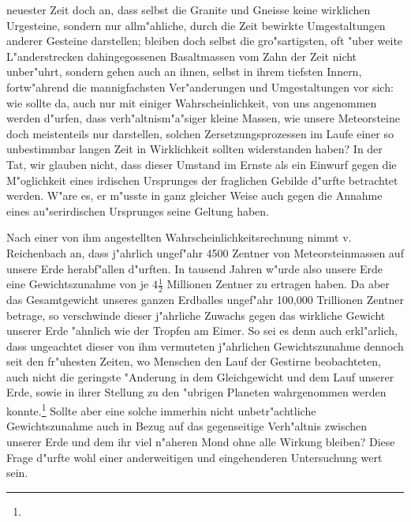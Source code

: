 \documentclass[a4paper, 8pt, oneside, polutonikogreek, german]{article}
\begin{document}
neuester Zeit doch an, dass selbst die Granite und Gneisse keine wirklichen Urgesteine, sondern nur allm"ahliche, durch die Zeit bewirkte Umgestaltungen anderer Gesteine darstellen; bleiben doch selbst die gro"sartigsten, oft "uber weite L"anderstrecken dahingegossenen Basaltmassen vom Zahn der Zeit nicht unber"uhrt, sondern gehen auch an ihnen, selbst in ihrem tiefsten Innern, fortw"ahrend die mannigfachsten Ver"anderungen und Umgestaltungen vor sich: wie sollte da, auch nur mit einiger Wahrscheinlichkeit, von uns angenommen werden d"urfen, dass verh"altnism"a"siger kleine Massen, wie unsere Meteorsteine doch meistenteils nur darstellen, solchen Zersetzungsprozessen im Laufe einer so unbestimmbar langen Zeit in Wirklichkeit sollten widerstanden haben? In der Tat, wir glauben nicht, dass dieser Umstand im Ernste als ein Einwurf gegen die M"oglichkeit eines irdischen Ursprunges der fraglichen Gebilde d"urfte betrachtet werden. W"are es, er m"usste in ganz gleicher Weise auch gegen die Annahme eines au"serirdischen Ursprunges seine Geltung haben.

Nach einer von ihm angestellten Wahrscheinlichkeitsrechnung nimmt v. Reichenbach an, dass j"ahrlich ungef"ahr 4500 Zentner von Meteorsteinmassen auf unsere Erde herabf"allen d"urften. In tausend Jahren w"urde also unsere Erde eine Gewichtszunahme von je $4\frac{1}{2}$ Millionen Zentner zu ertragen haben. Da aber das Gesamtgewicht unseres ganzen Erdballes ungef"ahr 100,000 Trillionen Zentner betrage, so verschwinde dieser j"ahrliche Zuwachs gegen das wirkliche Gewicht unserer Erde "ahnlich wie der Tropfen am Eimer. So sei es denn auch erkl"arlich, dass ungeachtet dieser von ihm vermuteten j"ahrlichen Gewichtszunahme dennoch seit den fr"uhesten Zeiten, wo Menschen den Lauf der Gestirne beobachteten, auch nicht die geringste "Anderung in dem Gleichgewicht und dem Lauf unserer Erde, sowie in ihrer Stellung zu den "ubrigen Planeten wahrgenommen werden konnte.\footnote{} Sollte aber eine solche immerhin nicht unbetr"achtliche Gewichtszunahme auch in Bezug auf das gegenseitige Verh"altnis zwischen unserer Erde und dem ihr viel n"aheren Mond ohne alle Wirkung bleiben? Diese Frage d"urfte wohl einer anderweitigen und eingehenderen Untersuchung wert sein.
\end{document}
